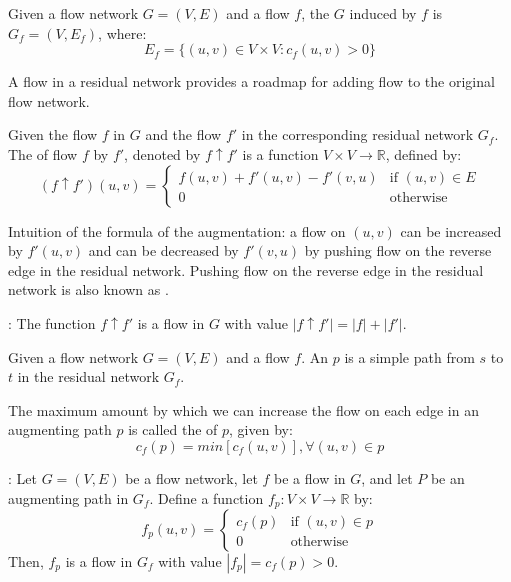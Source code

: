     \par Given a flow network $G = (V, E)$ and a flow $f$, the  $G$ induced by $f$ is $G_f = (V, E_f)$, where:
      \[
        E_f = \{(u, v) \in V \times V: c_f(u, v) > 0\}
      \]
    \par A flow in a residual network provides a roadmap for adding flow to the original flow network.

    \par Given the flow $f$ in $G$ and the flow $f'$ in the corresponding residual network $G_f$. The  of flow $f$ by $f'$, denoted by $f \uparrow f'$ is a function $V \times V \to \mathbb{R}$, defined by:
      \[
        (f \uparrow f') (u, v) =
          \begin{cases}
            f(u, v) + f'(u, v) - f'(v, u) & \text{if } (u, v) \in E \\
            0                             & \text{otherwise}
          \end{cases}
      \]

    \par Intuition of the formula of the augmentation: a flow on $(u, v)$ can be increased by $f'(u, v)$ and can be decreased by $f'(v, u)$ by pushing flow on the reverse edge in the residual network. Pushing flow on the reverse edge in the residual network is also known as .

    \par {}: The function $f \uparrow f'$ is a flow in $G$ with value $|f \uparrow f'| = |f| + |f'|$.

      \par Given a flow network $G = (V, E)$ and a flow $f$. An  $p$ is a simple path from $s$ to $t$ in the residual network $G_f$.
      \par The maximum amount by which we can increase the flow on each edge in an augmenting path $p$ is called the  of $p$, given by:
        \[
          c_f(p) = min[c_f(u, v)], \forall (u, v) \in p
        \]

      \par {}: Let $G = (V, E)$ be a flow network, let $f$ be a flow in $G$, and let $P$ be an augmenting path in $G_f$. Define a function $f_p: V \times V \to \mathbb{R}$ by:
      \[
        f_p (u, v) =
          \begin{cases}
            c_f(p) & \text{if } (u, v) \in p \\
            0       & \text{otherwise}
          \end{cases}
      \]
      Then, $f_p$ is a flow in $G_f$ with value $|f_p| = c_f(p) > 0$.

